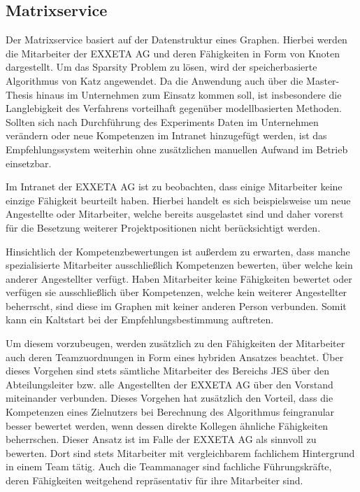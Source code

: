\subsection{Matrixservice}
\label{ch:methodik:versuchsaufbau:systemarchitektur:matrixservice}
Der Matrixservice basiert auf der Datenstruktur eines Graphen. Hierbei werden die Mitarbeiter der EXXETA AG und deren Fähigkeiten in Form von Knoten dargestellt. Um das Sparsity Problem zu lösen, wird der speicherbasierte Algorithmus von Katz angewendet. Da die Anwendung auch über die Master-Thesis hinaus im Unternehmen zum Einsatz kommen soll, ist insbesondere die Langlebigkeit des Verfahrens vorteilhaft gegenüber modellbasierten Methoden. Sollten sich nach Durchführung des Experiments Daten im Unternehmen verändern oder neue Kompetenzen im Intranet hinzugefügt werden, ist das Empfehlungssystem weiterhin ohne zusätzlichen manuellen Aufwand im Betrieb einsetzbar.

Im Intranet der EXXETA AG ist zu beobachten, dass einige Mitarbeiter keine einzige Fähigkeit beurteilt haben. Hierbei handelt es sich beispielsweise um neue Angestellte oder Mitarbeiter, welche bereits ausgelastet sind und daher vorerst für die Besetzung weiterer Projektpositionen nicht berücksichtigt werden.

Hinsichtlich der Kompetenzbewertungen ist außerdem zu erwarten, dass manche spezialisierte Mitarbeiter ausschließlich Kompetenzen bewerten, über welche kein anderer Angestellter verfügt. Haben Mitarbeiter keine Fähigkeiten bewertet oder verfügen sie ausschließlich über Kompetenzen, welche kein weiterer Angestellter beherrscht, sind diese im Graphen mit keiner anderen Person verbunden. Somit kann ein Kaltstart bei der Empfehlungsbestimmung auftreten.

Um diesem vorzubeugen, werden zusätzlich zu den Fähigkeiten der Mitarbeiter auch deren Teamzuordnungen in Form eines hybriden Ansatzes beachtet. Über dieses Vorgehen sind stets sämtliche Mitarbeiter des Bereichs \acl{JES} über den Abteilungsleiter bzw. alle Angestellten der EXXETA AG über den Vorstand miteinander verbunden. Dieses Vorgehen hat zusätzlich den Vorteil, dass die Kompetenzen eines Zielnutzers bei Berechnung des Algorithmus feingranular besser bewertet werden, wenn dessen direkte Kollegen ähnliche Fähigkeiten beherrschen. Dieser Ansatz ist im Falle der EXXETA AG als sinnvoll zu bewerten. Dort sind stets Mitarbeiter mit vergleichbarem fachlichem Hintergrund in einem Team tätig. Auch die Teammanager sind fachliche Führungskräfte, deren Fähigkeiten weitgehend repräsentativ für ihre Mitarbeiter sind.

